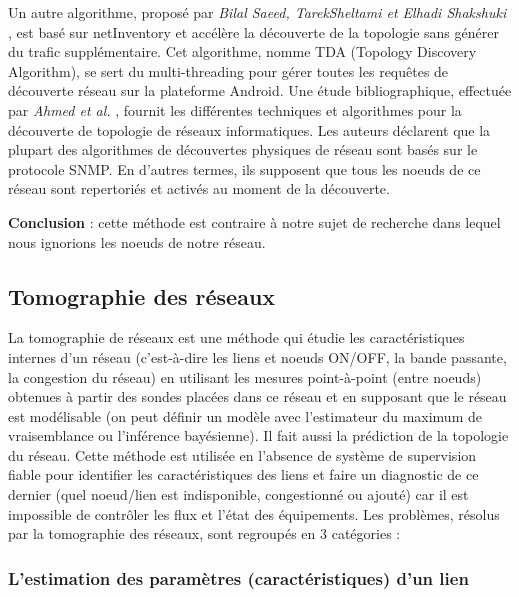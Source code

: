 \newline
Un autre algorithme, propos\'e par {\em Bilal Saeed, TarekSheltami et Elhadi Shakshuki} \cite{SAEED2015104}, est bas\'e sur netInventory et acc\'el\`ere la d\'ecouverte de la topologie sans g\'en\'erer du trafic suppl\'ementaire. Cet algorithme, nomme TDA (Topology Discovery Algorithm), se sert du multi-threading pour g\'erer toutes les requ\^etes de d\'ecouverte r\'eseau sur la plateforme Android.
Une \'etude bibliographique, effectu\'ee par {\em Ahmed et al.} \cite{AhmedRafatAbouchabaka2014}, fournit les diff\'erentes techniques et algorithmes pour la d\'ecouverte de topologie de r\'eseaux informatiques. Les auteurs d\'eclarent que la plupart des algorithmes de d\'ecouvertes physiques de r\'eseau sont bas\'es sur le protocole SNMP. En d'autres termes, ils supposent que tous les noeuds de ce r\'eseau sont repertori\'es et activ\'es au moment de la d\'ecouverte. 
\newline

{\bf Conclusion} :
cette m\'ethode est contraire \`a notre sujet de recherche dans lequel nous ignorions les noeuds de notre r\'eseau.

\subsection{Tomographie des r\'eseaux}
La tomographie de r\'eseaux est une m\'ethode qui \'etudie les caract\'eristiques internes d'un r\'eseau (c'est-\`a-dire les liens et noeuds ON/OFF, la bande passante, la congestion du r\'eseau) en utilisant les mesures point-\`a-point (entre noeuds) obtenues \`a partir des sondes plac\'ees dans ce r\'eseau et en supposant que le r\'eseau est mod\'elisable (on peut d\'efinir un mod\`ele avec l'estimateur du maximum de vraisemblance ou l'inf\'erence bay\'esienne). Il fait aussi la pr\'ediction de la topologie du r\'eseau.
\newline
Cette m\'ethode est utilis\'ee en l'absence de syst\`eme de supervision fiable pour identifier les caract\'eristiques des liens et faire un diagnostic de ce dernier (quel noeud/lien est indisponible, congestionn\'e ou ajout\'e) car il est impossible de contr\^oler les flux et l'\'etat des \'equipements.
Les probl\`emes, r\'esolus par la tomographie des r\'eseaux,  sont regroup\'es en $3$ cat\'egories :

\subsubsection{L'estimation des param\`etres (caract\'eristiques) d'un lien}

